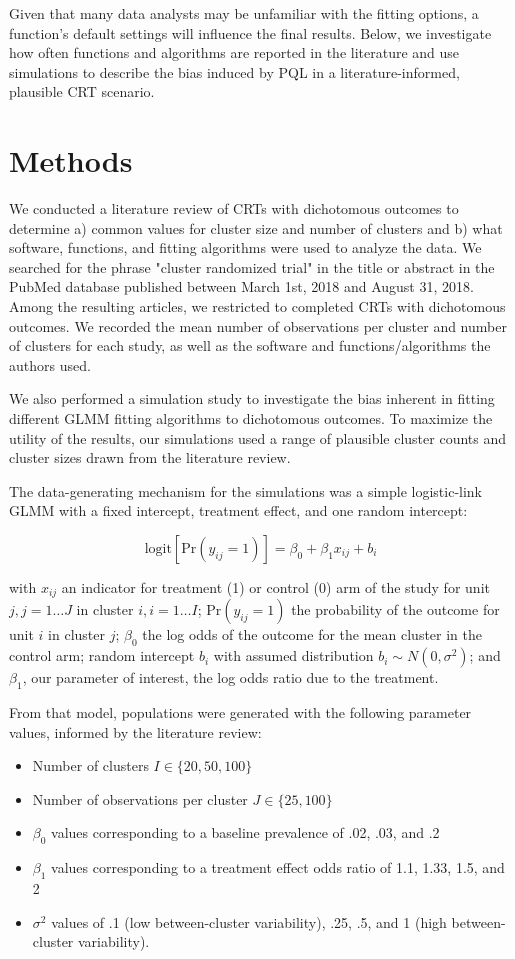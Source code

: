 \documentclass[Afour,times,sagev,doublespace]{sagej}
\begin{document}
Given that many data analysts may be unfamiliar with the fitting options, a function's default settings will influence the final results. Below, we investigate how often functions and algorithms are reported in the literature and use simulations to describe the bias induced by PQL in a literature-informed, plausible CRT scenario.


\section{Methods}


We conducted a literature review of CRTs with dichotomous outcomes to determine a) common values for cluster size and number of clusters and b) what software, functions, and fitting algorithms were used to analyze the data. We searched for the phrase "cluster randomized trial" in the title or abstract in the PubMed database published between March 1st, 2018 and August 31, 2018. Among the resulting articles, we restricted to completed CRTs with dichotomous outcomes. We recorded the mean number of observations per cluster and number of clusters for each study, as well as the software and functions/algorithms the authors used.

We also performed a simulation study to investigate the bias inherent in fitting different GLMM fitting algorithms to dichotomous outcomes. To maximize the utility of the results, our simulations used a range of plausible cluster counts and cluster sizes drawn from the literature review.

The data-generating mechanism for the simulations was a simple logistic-link GLMM with a fixed intercept, treatment effect, and one random intercept:

\begin{equation}
    \text{logit}[\text{Pr}(y_{ij}=1)]=\beta_0 + \beta_1 x_{ij} + b_i
\end{equation}

with $x_{ij}$ an indicator for treatment (1) or control (0) arm of the study for unit $j, j = 1 \dots J$  in cluster $i, i = 1 \dots I$; $\text{Pr}(y_{ij}=1)$ the probability of the outcome for unit $i$ in cluster $j$; $\beta_0$ the log odds of the outcome for the mean cluster in the control arm; random intercept $b_i$ with assumed distribution $b_i \sim N(0, \sigma^2)$; and $\beta_1$, our parameter of interest, the log odds ratio due to the treatment. 

From that model, populations were generated with the following parameter values, informed by the literature review:
\begin{itemize}
    \item Number of clusters $I \in \{20, 50, 100\}$
    \item Number of observations per cluster $J \in \{25, 100\}$
    \item $\beta_0$ values corresponding to a baseline prevalence of .02, .03, and .2
    \item $\beta_1$ values corresponding to a treatment effect odds ratio of 1.1, 1.33, 1.5, and 2
    \item $\sigma^2$ values of .1 (low between-cluster variability), .25, .5, and 1 (high between-cluster variability).
\end{itemize}
\end{document}
